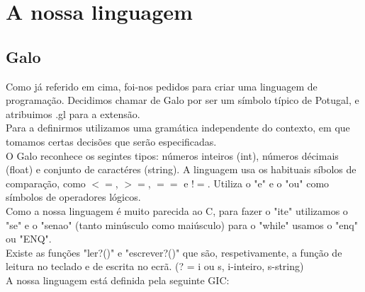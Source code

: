 \documentclass{report}
\begin{document}
\section{A nossa linguagem}
\subsection{Galo}
\indent
Como já referido em cima, foi-nos pedidos para criar uma linguagem de programação. Decidimos chamar de Galo por ser um símbolo típico de Potugal, e atribuimos .gl para a extensão.\\
\indent
Para a definirmos utilizamos uma gramática independente do contexto, em que tomamos certas decisões que serão especificadas.\\
\indent
O Galo reconhece os segintes tipos: números inteiros (int), números décimais  (float) e conjunto de caractéres (string). A linguagem usa os habituais síbolos de comparação, como $<=$, $>=$, $==$ e $!=$. Utiliza o "e" e o "ou" como símbolos de operadores lógicos.\\
\indent
Como a nossa linguagem é muito parecida ao C, para fazer o "ite" utilizamos o "se" e o "senao" (tanto minúsculo como maiúsculo) para o "while" usamos o "enq" ou "ENQ".\\
\indent
Existe as funções "ler?()" e "escrever?()" que são, respetivamente, a função de leitura no teclado e de escrita no ecrã. (? = i ou s, i-inteiro, s-string) \\

\indent
A nossa linguagem está definida pela seguinte GIC:
\end{document}

